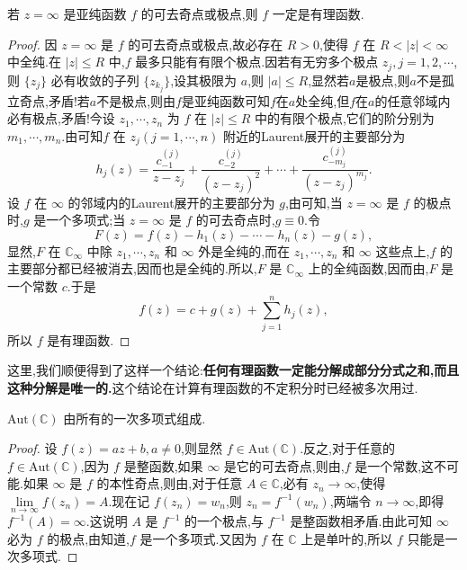 \documentclass[../../main.tex]{subfiles}
\begin{document}
\begin{theorem}\label{theorem:定理5.3.3}
若 \( z = \infty \) 是亚纯函数 \( f \) 的可去奇点或极点,则 \( f \) 一定是有理函数.
\end{theorem}
\begin{proof}
因 \( z = \infty \) 是 \( f \) 的可去奇点或极点,故必存在 \( R > 0 \),使得 \( f \) 在 \( R < |z| < \infty \) 中全纯.在 \( |z| \leqslant R \) 中,\( f \) 最多只能有有限个极点.因若有无穷多个极点 \( z_j, j = 1, 2, \cdots \),则 \( \{ z_j \} \) 必有收敛的子列 \( \{ z_{k_j} \} \),设其极限为 \( a \),则 \( |a| \leqslant R \),显然若$a$是极点,则\( a \)不是孤立奇点,矛盾!若$a$不是极点,则由$f$是亚纯函数可知$f$在$a$处全纯,但$f$在$a$的任意邻域内必有极点,矛盾!今设 \( z_1, \cdots, z_n \) 为 \( f \) 在 \( |z| \leqslant R \) 中的有限个极点,它们的阶分别为 \( m_1, \cdots, m_n \).由可知\( f \) 在 \( z_j (j = 1, \cdots, n) \) 附近的Laurent展开的主要部分为
\[
h_j(z) = \frac{c_{-1}^{(j)}}{z - z_j} + \frac{c_{-2}^{(j)}}{(z - z_j)^2} + \cdots + \frac{c_{-m_j}^{(j)}}{(z - z_j)^{m_j}}.
\]
设 \( f \) 在 \( \infty \) 的邻域内的Laurent展开的主要部分为 \( g \),由可知,当 \( z = \infty \) 是 \( f \) 的极点时,\( g \) 是一个多项式;当 \( z = \infty \) 是 \( f \) 的可去奇点时,\( g \equiv 0 \).令
\[
F(z) = f(z) - h_1(z) - \cdots - h_n(z) - g(z),
\]
显然,\( F \) 在 \( \mathbb{C}_{\infty} \) 中除 \( z_1, \cdots, z_n \) 和 \( \infty \) 外是全纯的,而在 \( z_1, \cdots, z_n \) 和 \( \infty \) 这些点上,\( f \) 的主要部分都已经被消去,因而也是全纯的.所以,\( F \) 是 \( \mathbb{C}_{\infty} \) 上的全纯函数,因而由,\( F \) 是一个常数 \( c \).于是
\[
f(z) = c + g(z) + \sum_{j = 1}^{n} h_j(z),
\]
所以 \( f \) 是有理函数.
\end{proof}
\begin{remark}
这里,我们顺便得到了这样一个结论:\textbf{任何有理函数一定能分解成部分分式之和,而且这种分解是唯一的.}这个结论在计算有理函数的不定积分时已经被多次用过.
\end{remark}

\begin{theorem}\label{theorem:定理5.3.4}
\( \mathrm{Aut}(\mathbb{C}) \) 由所有的一次多项式组成.
\end{theorem}
\begin{proof}
设 \( f(z) = az + b, a \neq 0 \),则显然 \( f \in \mathrm{Aut}(\mathbb{C}) \).反之,对于任意的 \( f \in \mathrm{Aut}(\mathbb{C}) \),因为 \( f \) 是整函数,如果 \( \infty \) 是它的可去奇点,则由,\( f \) 是一个常数,这不可能.如果 \( \infty \) 是 \( f \) 的本性奇点,则由,对于任意 \( A \in \mathbb{C} \),必有 \( z_n \to \infty \),使得 \( \lim\limits_{n \to \infty} f(z_n) = A \).现在记 \( f(z_n) = w_n \),则 \( z_n = f^{-1}(w_n) \),两端令 \( n \to \infty \),即得 \( f^{-1}(A) = \infty \).这说明 \( A \) 是 \( f^{-1} \) 的一个极点,与 \( f^{-1} \) 是整函数相矛盾.由此可知 \( \infty \) 必为 \( f \) 的极点,由知道,\( f \) 是一个多项式.又因为 \( f \) 在 \( \mathbb{C} \) 上是单叶的,所以 \( f \) 只能是一次多项式.
\end{proof}
\end{document}
